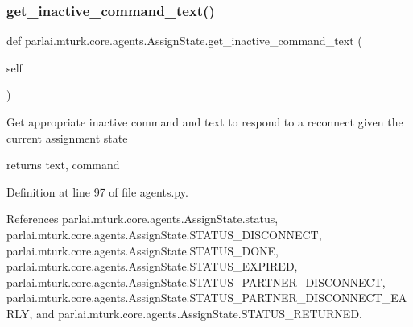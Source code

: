 \mbox{\label{classparlai_1_1mturk_1_1core_1_1agents_1_1AssignState_aeda3adf715e8ed5a39d302792b056960}} 
\subsubsection{\texorpdfstring{get\+\_\+inactive\+\_\+command\+\_\+text()}{get\_inactive\_command\_text()}}
{\footnotesize\ttfamily def parlai.\+mturk.\+core.\+agents.\+Assign\+State.\+get\+\_\+inactive\+\_\+command\+\_\+text (\begin{DoxyParamCaption}\item[{}]{self }\end{DoxyParamCaption})}

\begin{DoxyVerb}Get appropriate inactive command and text to respond to a reconnect
given the current assignment state

returns text, command
\end{DoxyVerb}
 

Definition at line 97 of file agents.\+py.



References parlai.\+mturk.\+core.\+agents.\+Assign\+State.\+status, parlai.\+mturk.\+core.\+agents.\+Assign\+State.\+S\+T\+A\+T\+U\+S\+\_\+\+D\+I\+S\+C\+O\+N\+N\+E\+CT, parlai.\+mturk.\+core.\+agents.\+Assign\+State.\+S\+T\+A\+T\+U\+S\+\_\+\+D\+O\+NE, parlai.\+mturk.\+core.\+agents.\+Assign\+State.\+S\+T\+A\+T\+U\+S\+\_\+\+E\+X\+P\+I\+R\+ED, parlai.\+mturk.\+core.\+agents.\+Assign\+State.\+S\+T\+A\+T\+U\+S\+\_\+\+P\+A\+R\+T\+N\+E\+R\+\_\+\+D\+I\+S\+C\+O\+N\+N\+E\+CT, parlai.\+mturk.\+core.\+agents.\+Assign\+State.\+S\+T\+A\+T\+U\+S\+\_\+\+P\+A\+R\+T\+N\+E\+R\+\_\+\+D\+I\+S\+C\+O\+N\+N\+E\+C\+T\+\_\+\+E\+A\+R\+LY, and parlai.\+mturk.\+core.\+agents.\+Assign\+State.\+S\+T\+A\+T\+U\+S\+\_\+\+R\+E\+T\+U\+R\+N\+ED.

\mbox{\label{classparlai_1_1mturk_1_1core_1_1agents_1_1AssignState_a50b030308201e7e8e91292ec2419400b}} 
